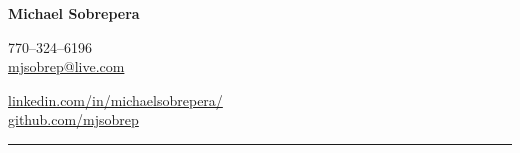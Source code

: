 \begin{center}
    {\LARGE \textbf{Michael Sobrepera}}\\[0cm]
    \begin{minipage}[c]{.35\textwidth}
        770--324--6196\\
        \href{mailto:mjsobrep@live.com}{mjsobrep@live.com}\\
    \end{minipage}
    \hspace{.28\textwidth}
    \begin{minipage}[r]{.35\textwidth}
        \raggedleft
        \href{https://www.linkedin.com/in/michaelsobrepera/}{linkedin.com/in/michaelsobrepera/}\\
        \href{https://github.com/mjsobrep}{github.com/mjsobrep}\\

    \end{minipage}
\end{center}
\hrule
\vspace{0cm}
